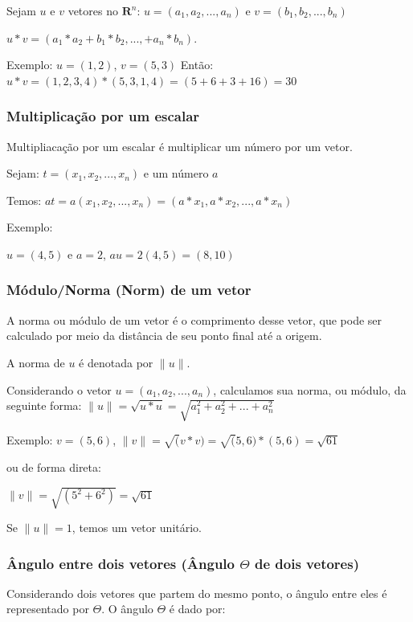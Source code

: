 \documentclass[12pt]{article}
\begin{document}
Sejam \(u\) e \(v\) vetores no \( \mathbf{R}^{n}\): \(u=(a_{1}, a_{2},...,a_{n})\) e \(v=(b_{1}, b_{2},...,b_{n})\)

\(u*v = (a_{1} * a_{2} + b_{1} * b_{2} ,..., + a_{n} * b_{n})\).

Exemplo: \(u = (1,2)\), \(v = (5, 3)\)
Então: \(u*v = (1, 2, 3, 4) * (5, 3, 1, 4) = (5 + 6 + 3 + 16) = 30\)

\subsubsection{Multiplicação por um escalar}

Multipliacação por um escalar é multiplicar um número por um vetor.

Sejam: \(t = (x_{1}, x_{2}, ..., x_{n})\) e um número \(a\)

Temos: \(at = a(x_{1}, x_{2}, ..., x_{n}) = (a*x_{1}, a*x_{2}, ..., a*x_{n})\)

Exemplo:

\(u = (4, 5)\) e \(a = 2\), \(au = 2(4, 5) = (8, 10)\)

\subsubsection{Módulo/Norma (Norm) de um vetor}

A norma ou módulo de um vetor é o comprimento desse vetor, que pode ser calculado por meio da distância de seu ponto final até a origem.

A norma de \( u \) é denotada por \( \| u \| \).

Considerando o vetor \(u = (a_{1}, a_{2}, ..., a_{n})\), calculamos sua norma, ou módulo, da seguinte forma\cite{lipschutz-algebra, anton2012algebra}: \( \|u\| = \sqrt{u*u} = \sqrt{a_{1}^2 + a_{2}^2 + ... + a_{n}^2} \) 

Exemplo: \(v = (5, 6)\), \(\|v\| = \sqrt(v*v) = \sqrt(5,6)*(5,6) = \sqrt{61}\)

ou de forma direta:

\(\|v\| = \sqrt{(5^2+6^2)} = \sqrt{61}\)


Se \(\|u\| = 1\), temos um vetor unitário.

\subsubsection{Ângulo entre dois vetores (Ângulo $\Theta$ de dois vetores)}

Considerando dois vetores que partem do mesmo ponto, o ângulo entre eles é representado por $\Theta$. O ângulo $\Theta$ é dado por:
\end{document}
